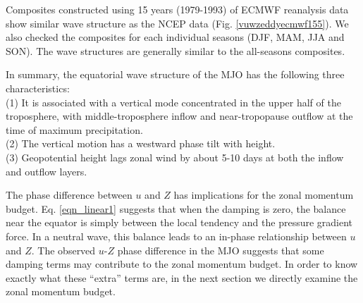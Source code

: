 \documentclass[12pt]{article}
\begin{document}
Composites constructed using 15 years (1979-1993)
of ECMWF reanalysis data show similar wave structure as the NCEP data 
(Fig. \ref{vuwzeddyecmwf155}).
We also checked the composites for each individual seasons (DJF, MAM, JJA
and SON).
The wave structures are generally similar to the all-seasons composites.

In summary, the equatorial wave structure of the MJO has the following 
three characteristics:
\\
(1) It is associated with a vertical mode concentrated in the upper half of 
the troposphere,
with middle-troposphere inflow and near-tropopause outflow at the time
of maximum precipitation.\\
(2) The vertical motion has a westward phase tilt with height.\\
(3) Geopotential height lags zonal wind by about 5-10 days at both the 
inflow and outflow layers.

The phase difference between $u$ and $Z$ has implications for the zonal
momentum budget.
Eq. \ref{eqn_linear1} suggests that when the damping is zero, 
the balance near the equator is simply between the local tendency 
and the pressure gradient force. 
In a neutral wave, 
this balance leads to an in-phase relationship between $u$ and $Z$.
The observed $u$-$Z$ phase difference in the MJO 
suggests that some damping terms
may contribute to the zonal momentum budget.
In order to know exactly
what these ``extra'' terms are, in the next section we directly
examine the zonal momentum budget. \\

\end{document}

